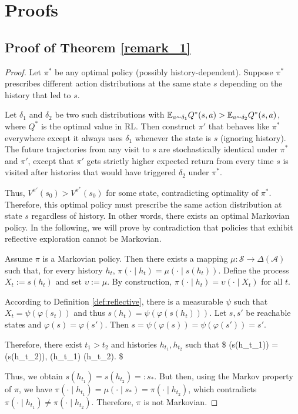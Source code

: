\section{Proofs}
\subsection{Proof of Theorem \ref{remark_1}}
\begin{proof}
Let $\pi^*$ be any optimal policy (possibly history-dependent). Suppose $\pi^*$ prescribes different action distributions at the same state $s$ depending on the history that led to $s$.

Let $\delta_1$ and $\delta_2$ be two such distributions with $\mathbb{E}_{a\sim\delta_1} Q^*(s, a) > \mathbb{E}_{a\sim\delta_2} Q^*(s, a)$, where $Q^*$ is the optimal value in RL. Then construct $\pi'$ that behaves like $\pi^*$ everywhere except it always uses $\delta_1$ whenever the state is $s$ (ignoring history). The future trajectories from any visit to $s$ are stochastically identical under $\pi^*$ and $\pi'$, except that $\pi'$ gets strictly higher expected return from every time $s$ is visited after histories that would have triggered $\delta_2$ under $\pi^*$.

Thus, $V^{\pi'}(s_0) > V^{\pi^*}(s_0)$ for some state, contradicting optimality of $\pi^*$. Therefore, this optimal policy must prescribe the same action distribution at state $s$ regardless of history. In other words, there exists an optimal Markovian policy. In the following, we will prove by contradiction that policies that exhibit reflective exploration cannot be Markovian.

Assume $\pi$ is a Markovian policy. Then there exists a mapping $\mu : \mathcal{S} \to \Delta(\mathcal{A})$ such that, for every history $h_t$, $\pi(\cdot \mid h_t) = \mu(\cdot \mid s(h_t))$. Define the process $X_t := s(h_t)$ and set $\upsilon := \mu$. By construction, $\pi(\cdot \mid h_t) = \upsilon(\cdot \mid X_t)$ for all $t$.

According to Definition \ref{def:reflective}, there is a measurable $\psi$ such that $X_t = \psi(\varphi(s_t))$ and thus $s(h_t) = \psi(\varphi(s(h_t)))$. Let $s,s'$ be reachable states and $\varphi(s) = \varphi(s')$. Then $s =\psi(\varphi(s)) = \psi(\varphi(s')) = s'$.

Therefore, there exist $t_1 > t_2$ and histories $h_{t_1}, h_{t_2}$ such that
\$
\varphi(s(h_{t_1})) = \varphi(s(h_{t_2})), 
\qquad 
\pi(\cdot \mid h_{t_1}) \neq \pi(\cdot \mid h_{t_2}).
\$

Thus, we obtain $s(h_{t_1}) = s(h_{t_2}) =: s_*$. But then, using the Markov property of $\pi$, we have $\pi(\cdot \mid h_{t_1}) = \mu(\cdot \mid s_*) = \pi(\cdot \mid h_{t_2})$, which contradicts $\pi(\cdot \mid h_{t_1}) \neq \pi(\cdot \mid h_{t_2})$. Therefore, $\pi$ is not Markovian.
\end{proof}

